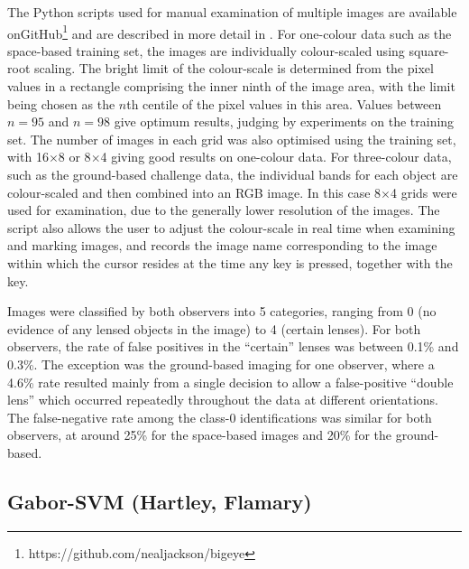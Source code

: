 \documentclass[useAMS,usenatbib]{mnras}
\begin{document}
The Python scripts used for manual examination of multiple images are available
onGitHub\footnote{https://github.com/nealjackson/bigeye} and are described in more detail
in \citet{hartley2017support}. For one-colour data such as
the space-based training set, the images are individually colour-scaled using
square-root scaling. The bright limit of the colour-scale is determined
from the pixel values in a rectangle comprising the inner ninth of the
image area, with the limit being chosen as the $n$th centile of the pixel
values in this area. Values between $n=95$ and $n=98$ give optimum results,
judging by experiments on the training set. The number of images in each
grid was also optimised using the training set, with 16$\times$8 or 
8$\times$4 giving good results on one-colour data. For three-colour data,
such as the ground-based challenge data, the individual bands for each 
object are colour-scaled and then combined into an RGB image. In this case
8$\times$4 grids were used for examination, due to the generally lower 
resolution of the images. The script also allows the user to adjust the
colour-scale in real time when examining and marking images, and records
the image name corresponding to the image within which the cursor resides
at the time any key is pressed, together with the key.

Images were classified by both observers into 5 categories, ranging from
0 (no evidence of any lensed objects in the image) to 4 (certain lenses).
For both observers, the rate of false positives in the ``certain'' lenses
was between 0.1\% and 0.3\%. The exception was the ground-based imaging 
for one observer, where a 4.6\% rate resulted mainly from a
single decision to allow a false-positive ``double lens'' which occurred
repeatedly throughout the data at different orientations. The false-negative
rate among the class-0 identifications was similar for both observers, at
around 25\% for the space-based images and 20\% for the ground-based.

\subsection{Gabor-SVM (Hartley, Flamary)}
\end{document}
